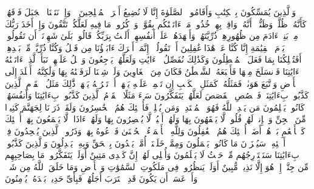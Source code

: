\stopbuffer
\startbuffer[\q:7:170]
وَٱلَّذِینَ یُمَسِّكُونَ بِٱلۡكِتَٰبِ وَأَقَامُوا۟ ٱلصَّلَوٰةَ إِنَّا لَا نُضِیعُ أَجۡرَ ٱلۡمُصۡلِحِینَ%
\stopbuffer
\startbuffer[\q:7:171]
۞ وَإِذۡ نَتَقۡنَا ٱلۡجَبَلَ فَوۡقَهُمۡ كَأَنَّهُۥ ظُلَّةࣱ وَظَنُّوۤا۟ أَنَّهُۥ وَاقِعُۢ بِهِمۡ خُذُوا۟ مَاۤ ءَاتَیۡنَٰكُم بِقُوَّةࣲ وَٱذۡكُرُوا۟ مَا فِیهِ لَعَلَّكُمۡ تَتَّقُونَ%
\stopbuffer
\startbuffer[\q:7:172]
وَإِذۡ أَخَذَ رَبُّكَ مِنۢ بَنِیۤ ءَادَمَ مِن ظُهُورِهِمۡ ذُرِّیَّتَهُمۡ وَأَشۡهَدَهُمۡ عَلَىٰۤ أَنفُسِهِمۡ أَلَسۡتُ بِرَبِّكُمۡۖ قَالُوا۟ بَلَىٰ شَهِدۡنَاۤۚ أَن تَقُولُوا۟ یَوۡمَ ٱلۡقِیَٰمَةِ إِنَّا كُنَّا عَنۡ هَٰذَا غَٰفِلِینَ%
\stopbuffer
\startbuffer[\q:7:173]
أَوۡ تَقُولُوۤا۟ إِنَّمَاۤ أَشۡرَكَ ءَابَاۤؤُنَا مِن قَبۡلُ وَكُنَّا ذُرِّیَّةࣰ مِّنۢ بَعۡدِهِمۡۖ أَفَتُهۡلِكُنَا بِمَا فَعَلَ ٱلۡمُبۡطِلُونَ%
\stopbuffer
\startbuffer[\q:7:174]
وَكَذَٰلِكَ نُفَصِّلُ ٱلۡءَایَٰتِ وَلَعَلَّهُمۡ یَرۡجِعُونَ%
\stopbuffer
\startbuffer[\q:7:175]
وَٱتۡلُ عَلَیۡهِمۡ نَبَأَ ٱلَّذِیۤ ءَاتَیۡنَٰهُ ءَایَٰتِنَا فَٱنسَلَخَ مِنۡهَا فَأَتۡبَعَهُ ٱلشَّیۡطَٰنُ فَكَانَ مِنَ ٱلۡغَاوِینَ%
\stopbuffer
\startbuffer[\q:7:176]
وَلَوۡ شِئۡنَا لَرَفَعۡنَٰهُ بِهَا وَلَٰكِنَّهُۥۤ أَخۡلَدَ إِلَى ٱلۡأَرۡضِ وَٱتَّبَعَ هَوَىٰهُۚ فَمَثَلُهُۥ كَمَثَلِ ٱلۡكَلۡبِ إِن تَحۡمِلۡ عَلَیۡهِ یَلۡهَثۡ أَوۡ تَتۡرُكۡهُ یَلۡهَثۚ ذَّٰلِكَ مَثَلُ ٱلۡقَوۡمِ ٱلَّذِینَ كَذَّبُوا۟ بِءَایَٰتِنَاۚ فَٱقۡصُصِ ٱلۡقَصَصَ لَعَلَّهُمۡ یَتَفَكَّرُونَ%
\stopbuffer
\startbuffer[\q:7:177]
سَاۤءَ مَثَلًا ٱلۡقَوۡمُ ٱلَّذِینَ كَذَّبُوا۟ بِءَایَٰتِنَا وَأَنفُسَهُمۡ كَانُوا۟ یَظۡلِمُونَ%
\stopbuffer
\startbuffer[\q:7:178]
مَن یَهۡدِ ٱللَّهُ فَهُوَ ٱلۡمُهۡتَدِیۖ وَمَن یُضۡلِلۡ فَأُو۟لَٰۤئِكَ هُمُ ٱلۡخَٰسِرُونَ%
\stopbuffer
\startbuffer[\q:7:179]
وَلَقَدۡ ذَرَأۡنَا لِجَهَنَّمَ كَثِیرࣰا مِّنَ ٱلۡجِنِّ وَٱلۡإِنسِۖ لَهُمۡ قُلُوبࣱ لَّا یَفۡقَهُونَ بِهَا وَلَهُمۡ أَعۡیُنࣱ لَّا یُبۡصِرُونَ بِهَا وَلَهُمۡ ءَاذَانࣱ لَّا یَسۡمَعُونَ بِهَاۤۚ أُو۟لَٰۤئِكَ كَٱلۡأَنۡعَٰمِ بَلۡ هُمۡ أَضَلُّۚ أُو۟لَٰۤئِكَ هُمُ ٱلۡغَٰفِلُونَ%
\stopbuffer
\startbuffer[\q:7:180]
وَلِلَّهِ ٱلۡأَسۡمَاۤءُ ٱلۡحُسۡنَىٰ فَٱدۡعُوهُ بِهَاۖ وَذَرُوا۟ ٱلَّذِینَ یُلۡحِدُونَ فِیۤ أَسۡمَٰۤئِهِۦۚ سَیُجۡزَوۡنَ مَا كَانُوا۟ یَعۡمَلُونَ%
\stopbuffer
\startbuffer[\q:7:181]
وَمِمَّنۡ خَلَقۡنَاۤ أُمَّةࣱ یَهۡدُونَ بِٱلۡحَقِّ وَبِهِۦ یَعۡدِلُونَ%
\stopbuffer
\startbuffer[\q:7:182]
وَٱلَّذِینَ كَذَّبُوا۟ بِءَایَٰتِنَا سَنَسۡتَدۡرِجُهُم مِّنۡ حَیۡثُ لَا یَعۡلَمُونَ%
\stopbuffer
\startbuffer[\q:7:183]
وَأُمۡلِی لَهُمۡۚ إِنَّ كَیۡدِی مَتِینٌ%
\stopbuffer
\startbuffer[\q:7:184]
أَوَلَمۡ یَتَفَكَّرُوا۟ۗ مَا بِصَاحِبِهِم مِّن جِنَّةٍۚ إِنۡ هُوَ إِلَّا نَذِیرࣱ مُّبِینٌ%
\stopbuffer
\startbuffer[\q:7:185]
أَوَلَمۡ یَنظُرُوا۟ فِی مَلَكُوتِ ٱلسَّمَٰوَٰتِ وَٱلۡأَرۡضِ وَمَا خَلَقَ ٱللَّهُ مِن شَیۡءࣲ وَأَنۡ عَسَىٰۤ أَن یَكُونَ قَدِ ٱقۡتَرَبَ أَجَلُهُمۡۖ فَبِأَیِّ حَدِیثِۭ بَعۡدَهُۥ یُؤۡمِنُونَ%
